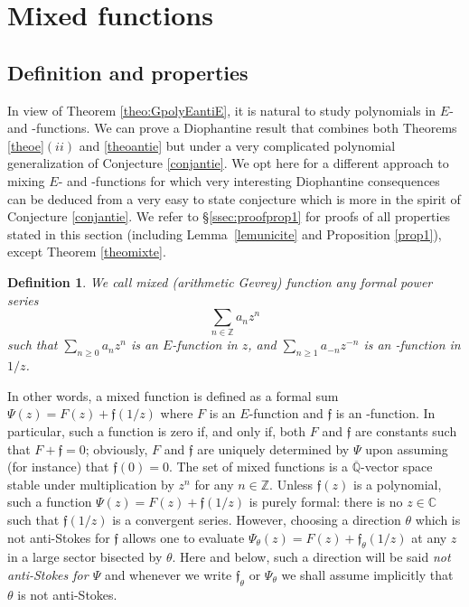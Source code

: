 \documentclass[reqno,12pt]{article}
\numberwithin{equation}{section}
\newtheorem{defi}{Definition}
\theoremstyle{remark}
\newcommand{\Z}{\mathbb{Z}}
\renewcommand{\C}{\mathbb{C}}
\newcommand{\Qbar}{\overline{\mathbb Q}}
\newcommand{\tantie}{\foreignlanguage{russian}{\CYREREV}}
\newcommand{\antie}{\text{\tantie}}
\newcommand{\fgo}{\mathfrak{f}}
\begin{document}
\section{Mixed  functions}\label{ssec:mixedfunctions}


\subsection{Definition and properties}

In view of Theorem \ref{theo:GpolyEantiE}, it is natural to study polynomials in $E$- and \tantie-functions. We can prove a Diophantine result that combines both Theorems \ref{theoe}$(ii)$ and \ref{theoantie} but under a very complicated polynomial  generalization of Conjecture \ref{conjantie}. We opt here for a different approach to mixing $E$- and \tantie-functions for which very interesting Diophantine consequences can be deduced from a very easy to state conjecture which is more in the spirit of Conjecture \ref{conjantie}. We refer to \S \ref{ssec:proofprop1} for proofs of all properties stated in this section (including Lemma~\ref{lemunicite} and Proposition \ref{prop1}), except Theorem \ref{theomixte}.

\begin{defi} \label{def:mixedfn}
We call {\em mixed (arithmetic Gevrey) function} any formal power series
$$\sum_{n\in\Z} a_n z^n$$
such that $\sum_{n\geq 0} a_n z^n$ is an $E$-function in $z$, and $\sum_{n\geq 1} a_{-n} z^{-n}$ is an \antie-function in $1/z$. 
\end{defi}
In other words, a mixed function is defined as a formal sum $\Psi(z)=F(z)+ \fgo (1/z)$ where $F$ is an $E$-function and $\fgo$ is an \antie-function. In particular, such a function is zero if, and only if, both $F$ and $\fgo$ are constants such that $F+\fgo=0$; obviously, $F$ and $\fgo$ are uniquely determined by $\Psi$ upon assuming (for instance) that $\fgo(0)=0$. The set of mixed functions is a $\Qbar$-vector space stable under multiplication by $z^n $ for any $n\in \Z$.  Unless $\fgo(z)$ is a polynomial, such a function $\Psi(z)=F(z)+ \fgo (1/z)$ is purely formal: there is no $z\in\C$ such that $\fgo(1/z)$ is a convergent series. However, choosing a  direction $\theta$  which is not anti-Stokes for   $\fgo$ allows one to evaluate $\Psi_\theta(z) = F(z)+  \fgo_{\theta} (1/z)$ at any $z$ in a large sector bisected by $\theta$. Here and below, 
such a direction will be said {\em not anti-Stokes for $\Psi$} and 
whenever we write $\fgo_{\theta}$ or $\Psi_\theta$ we shall assume implicitly that $\theta$ is not    anti-Stokes. 
\end{document}
